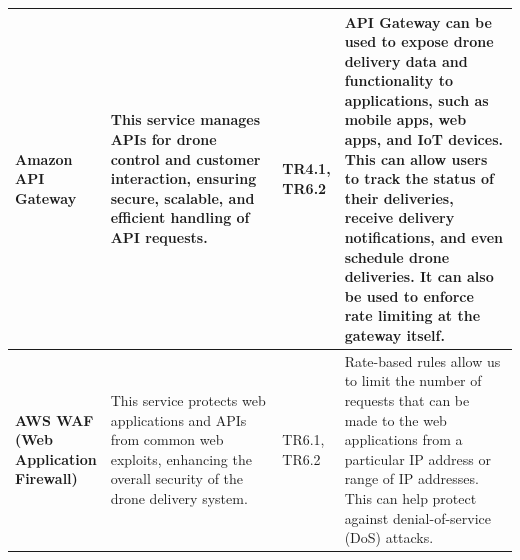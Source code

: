 \documentclass{article}
\begin{document}
\begin{table}[H]
\begin{tabular}{|p{0.125\linewidth}| p{0.4\linewidth} | p{0.075\linewidth} | p{0.4\linewidth} |}
         \\ \hline 
         \textbf{Amazon API Gateway \cite{apigateway}} &  This service manages APIs for drone control and customer interaction, ensuring secure, scalable, and efficient handling of API requests.& TR4.1, TR6.2 & 
        API Gateway can be used to expose drone delivery data and functionality to applications, such as mobile apps, web apps, and IoT devices. This can allow users to track the status of their deliveries, receive delivery notifications, and even schedule drone deliveries. It can also be used to enforce rate limiting at the gateway itself. 
         \\ \hline 

         \textbf{AWS WAF (Web Application Firewall) \cite{wafirewall}} &  This service protects web applications and APIs from common web exploits, enhancing the overall security of the drone delivery system.& TR6.1, TR6.2 &  Rate-based rules allow us to limit the number of requests that can be made to the web applications from a particular IP address or range of IP addresses. This can help protect against denial-of-service (DoS) attacks.\\ \hline 
    \end{tabular}
\end{table}
\end{document}
